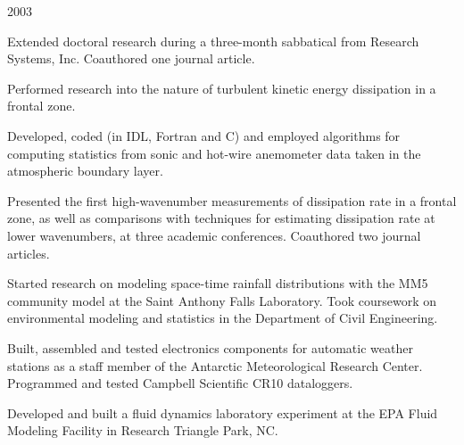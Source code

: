 \documentclass[letterpaper]{resume}
\begin{document}
 {2003}
\begin{compactitem}[\itembullet]
\item Extended doctoral research during a three-month sabbatical from
  Research Systems, Inc. Coauthored one journal article.
\end{compactitem}

\begin{compactitem}[\itembullet]
  \item Performed research into the nature of turbulent kinetic energy
    dissipation in a frontal zone.
  \item Developed, coded (in IDL, Fortran and C) and employed
    algorithms for computing statistics from sonic and hot-wire
    anemometer data taken in the atmospheric boundary layer.
  \item Presented the first high-wavenumber measurements of
    dissipation rate in a frontal zone, as well as comparisons with
    techniques for estimating dissipation rate at lower wavenumbers,
    at three academic conferences. Coauthored two journal articles.
\end{compactitem}

\begin{compactitem}[\itembullet]
  \item Started research on modeling space-time rainfall distributions
    with the MM5 community model at the Saint Anthony Falls
    Laboratory. Took coursework on environmental modeling and
    statistics in the Department of Civil Engineering.
\end{compactitem}

\begin{compactitem}[\itembullet]
  \item Built, assembled and tested electronics components for
    automatic weather stations as a staff member of the Antarctic
    Meteorological Research Center. Programmed and tested Campbell
    Scientific CR10 dataloggers.
\end{compactitem}

\begin{compactitem}[\itembullet]
  \item Developed and built a fluid dynamics laboratory experiment at
    the EPA Fluid Modeling Facility in Research Triangle Park, NC.
\end{compactitem}
\end{document}
